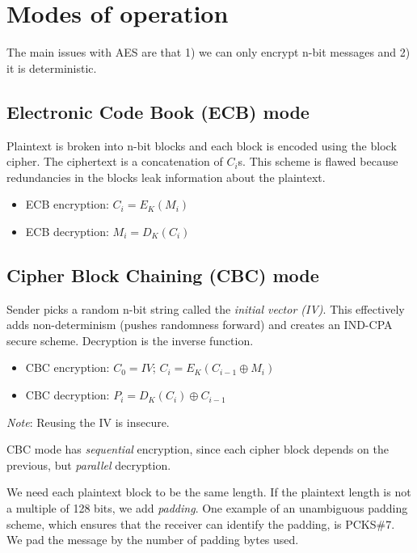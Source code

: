 \section{Modes of operation}
The main issues with AES are that 1) we can only encrypt n-bit messages and 2) it is deterministic.

\subsection{Electronic Code Book (ECB) mode}
Plaintext is broken into n-bit blocks and each block is encoded using the block cipher. The ciphertext is a concatenation of $C_i$s. This scheme is flawed because redundancies in the blocks leak information about the plaintext.
\begin{itemize}
    \item ECB encryption: $C_i = E_K(M_i)$
    \item ECB decryption: $M_i = D_K(C_i)$
\end{itemize}

\subsection{Cipher Block Chaining (CBC) mode}
Sender picks a random n-bit string called the \emph{initial vector (IV)}. This effectively adds non-determinism (pushes
 randomness forward) and creates an IND-CPA secure scheme. Decryption is the inverse function.
\begin{itemize}
    \item CBC encryption: $C_0 = IV$; $C_i = E_K(C_{i-1} \oplus M_i)$
    \item CBC decryption: $P_i = D_K(C_i) \oplus C_{i-1}$
\end{itemize}

\medskip

\emph{Note}: Reusing the IV is insecure.

\medskip

CBC mode has \emph{sequential} encryption, since each cipher block depends on the previous, but \emph{parallel} decryption.

\medskip

We need each plaintext block to be the same length. If the plaintext length is not a multiple of 128 bits, we add \emph{padding}. One example of an unambiguous padding scheme, which ensures that the receiver can identify the padding, is PCKS\#7. We pad the message by the number of padding bytes used.

